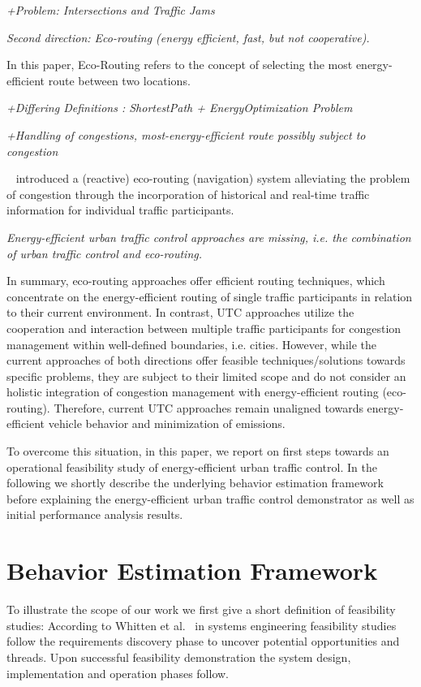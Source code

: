 \documentclass[conference]{../cls/IEEEtran}
\begin{document}
\textit{+Problem: Intersections and Traffic Jams}

\textit{Second direction: Eco-routing (energy efficient, fast, but not
cooperative).}

In this paper, Eco-Routing refers to the concept of selecting the most
energy-efficient route between two locations. 

\textit{+Differing Definitions : ShortestPath + EnergyOptimization Problem
~\cite{Barth2007}}

\textit{+Handling of congestions, most-energy-efficient route possibly
subject to congestion}

 ~\cite{Boriboonsomsin2012} introduced a (reactive) eco-routing (navigation)
 system alleviating the problem of congestion through the
 incorporation of historical and real-time traffic information for individual
 traffic participants.


\textit{Energy-efficient urban traffic control approaches are
missing, i.e.
the combination of urban traffic control and eco-routing.}

In summary, eco-routing approaches offer efficient routing techniques, which
concentrate on the energy-efficient routing of single traffic participants in
relation to their current environment.  In contrast, UTC approaches utilize the
cooperation and interaction between multiple traffic participants for congestion
management within well-defined boundaries, i.e.
cities. 
However, while the current approaches of both
directions offer feasible techniques/solutions towards specific problems, they are
subject to their limited scope and do not consider an holistic integration of
congestion management with energy-efficient routing (eco-routing). Therefore,
current UTC approaches remain unaligned towards energy-efficient vehicle
behavior and minimization of emissions.

To overcome this situation, in this paper, we report on first steps towards an
operational feasibility study of energy-efficient urban traffic control.
In the following we shortly describe the underlying behavior estimation
framework before explaining the energy-efficient urban traffic control demonstrator as well as initial performance analysis results.

\section{Behavior Estimation Framework}

To illustrate the scope of our work we first give a short definition of feasibility studies: 
According to Whitten et al.~\cite{Whitten2005} in systems engineering feasibility studies follow the requirements discovery phase to uncover potential opportunities and threads.
Upon successful feasibility demonstration the system design, implementation and operation phases follow.
\end{document}

